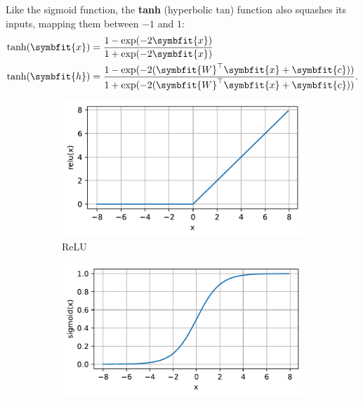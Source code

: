 Like the sigmoid function, the \textbf{tanh} (hyperbolic tan) function also squashes its inputs, mapping them between $-1$ and $1$:
\begin{equation}
\begin{split}
    \operatorname{tanh}(\symbfit{x}) & = \frac{1 - \exp(-2\symbfit{x})}{1 + \exp(-2\symbfit{x})} \\
    \operatorname{tanh}(\symbfit{h}) & = \frac{1 - \exp(-2(\symbfit{W}^\top\symbfit{x}+\symbfit{c}))}{1 + \exp(-2(\symbfit{W}^\top\symbfit{x}+\symbfit{c}))}.
\end{split}
\end{equation}

\begin{figure}[t]
     \centering
     \captionsetup{justification=centering}
     \begin{subfigure}[b]{0.3\textwidth}
         \centering
         \includegraphics[width=\textwidth]{chapters/assets/relu.pdf}
         \caption{ReLU}
         \label{fig:relu}
     \end{subfigure}
     \hfill
     \begin{subfigure}[b]{0.3\textwidth}
         \centering
         \includegraphics[width=\textwidth]{chapters/assets/sigmoid.pdf}

\end{subfigure}
\end{figure}
